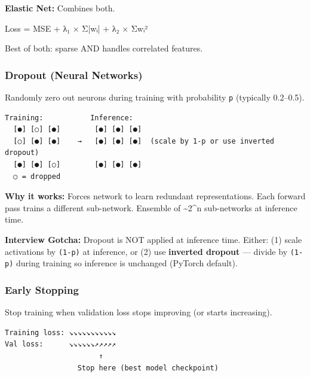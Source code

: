 \documentclass[11pt]{article}
\newenvironment{Shaded}{\begin{snugshade}}{\end{snugshade}}
\newcommand{\NormalTok}[1]{\textcolor[rgb]{0.81,0.81,0.76}{#1}}
\newcommand{\OperatorTok}[1]{\textcolor[rgb]{0.81,0.81,0.76}{#1}}
\begin{document}
\textbf{Elastic Net:} Combines both.


\begin{Shaded}
\begin{Highlighting}[]
\NormalTok{Loss }\OperatorTok{=}\NormalTok{ MSE }\OperatorTok{+}\NormalTok{ λ₁ × Σ}\OperatorTok{|}\NormalTok{wᵢ}\OperatorTok{|} \OperatorTok{+}\NormalTok{ λ₂ × Σwᵢ²}
\end{Highlighting}
\end{Shaded}

Best of both: sparse AND handles correlated features.

\subsubsection{Dropout (Neural Networks)}\label{dropout-neural-networks}

Randomly zero out neurons during training with probability \texttt{p} (typically 0.2--0.5).

\setcodelang{}

\begin{verbatim}
Training:           Inference:
  [●] [○] [●]        [●] [●] [●]
  [○] [●] [●]    →   [●] [●] [●]  (scale by 1-p or use inverted dropout)
  [●] [●] [○]        [●] [●] [●]
  ○ = dropped
\end{verbatim}

\textbf{Why it works:} Forces network to learn redundant representations. Each forward pass trains a different sub-network. Ensemble of \textasciitilde2\^{}n sub-networks at inference time.

\textbf{Interview Gotcha:} Dropout is NOT applied at inference time. Either: (1) scale activations by \texttt{(1-p)} at inference, or (2) use \textbf{inverted dropout} --- divide by \texttt{(1-p)} during training so inference is unchanged (PyTorch default).

\subsubsection{Early Stopping}\label{early-stopping}

Stop training when validation loss stops improving (or starts increasing).

\setcodelang{}

\begin{verbatim}
Training loss: ↘↘↘↘↘↘↘↘↘↘↘
Val loss:      ↘↘↘↘↘↘↗↗↗↗↗
                      ↑
                 Stop here (best model checkpoint)
\end{verbatim}
\end{document}
